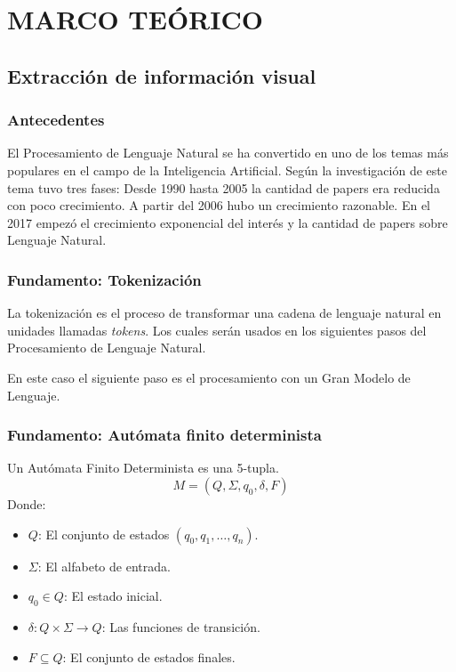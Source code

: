 \documentclass[../main.tex]{subfiles}
\begin{document}
\chapter{MARCO TEÓRICO}


\section{Extracción de información visual}

\subsection{Antecedentes}
El Procesamiento de Lenguaje Natural se ha convertido en uno de los temas más populares en el campo de la Inteligencia Artificial.
Según \citet{CHEN2022100001} la investigación de este tema tuvo tres fases:
Desde 1990 hasta 2005 la cantidad de papers era reducida con poco crecimiento.
A partir del 2006 hubo un crecimiento razonable.
En el 2017 empezó el crecimiento exponencial del interés y la cantidad de papers sobre Lenguaje Natural.

\subsection{Fundamento: Tokenización}

La tokenización es el proceso de transformar una cadena de lenguaje natural en unidades llamadas \emph{tokens}. \cite{Grefenstette1999}
Los cuales serán usados en los siguientes pasos del Procesamiento de Lenguaje Natural.

En este caso el siguiente paso es el procesamiento con un Gran Modelo de Lenguaje.

\subsection{Fundamento: Autómata finito determinista}

Un Autómata Finito Determinista es una 5-tupla. \cite{hopcroft2001introduction}
\[M = (Q, \Sigma, q_0, \delta, F)\]
Donde:
\begin{itemize}
	\item $Q$: El conjunto de estados $({q_0, q_1,\ldots,q_n})$.
	\item $\Sigma$: El alfabeto de entrada.
	\item $q_0 \in Q$: El estado inicial.
	\item $\delta: Q \times \Sigma \rightarrow Q$: Las funciones de transición.
	\item $F \subseteq Q$: El conjunto de estados finales.
\end{itemize}
\end{document}
